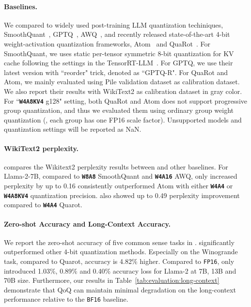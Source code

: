 \paragraph{Baselines.}
We compared \algo to widely used post-training LLM quantization techiniques, SmoothQuant~\cite{xiao2023smoothquant}, GPTQ~\cite{gptq}, AWQ~\cite{lin2023awq}, and recently released state-of-the-art 4-bit weight-activation quantization frameworks, Atom~\cite{zhao2023atom} and QuaRot~\cite{ashkboos2024quarot}. For SmoothQuant, we uses static per-tensor symmetric 8-bit quantization for KV cache following the settings in the TensorRT-LLM~\cite{trtllm}.
For GPTQ, we use their latest version with ``reorder" trick, denoted as ``GPTQ-R". For QuaRot and Atom, we mainly evaluated using Pile validation dataset as calibration dataset. We also report their results with WikiText2 as calibration dataset in gray color. For ``\textbf{\texttt{W4A8KV4}} g128" setting, both QuaRot and Atom does not support progressive group quantization, and thus we evaluated them using ordinary group weight quantization (\ie, each group has one FP16 scale factor). Unsupported models and quantization settings will be reported as NaN.




\paragraph{WikiText2 perplexity.} compares the Wikitext2 perplexity results between \algo and other baselines. For Llama-2-7B, compared to \textbf{\texttt{W8A8}} SmoothQuant and \textbf{\texttt{W4A16}} AWQ, \algo only increased perplexity by up to 0.16 %
\algo consistently outperformed Atom with either \textbf{\texttt{W4A4}} or \textbf{\texttt{W4A8KV4}} quantization precision. \algo also showed up to 0.49 perplexity improvement compared to \textbf{\texttt{W4A4}} Quarot.



\paragraph{Zero-shot Accuracy and Long-Context Accuracy.}We report the zero-shot accuracy of five common sense tasks in . \algo significantly outperformed other 4-bit quantization methods. 
Especially on the Winogrande task, compared to Quarot, \algo accuracy is 4.82\% higher.
Compared to \texttt{FP16}, \algo only introduced 1.03\%, 0.89\% and 0.40\% accuracy loss for Llama-2 at 7B, 13B and 70B size.
Furthermore, our results in Table~\ref{tab:evaluation:long-context} demonstrate that QoQ can maintain minimal degradation on the long-context performance relative to the \texttt{BF16} baseline.

